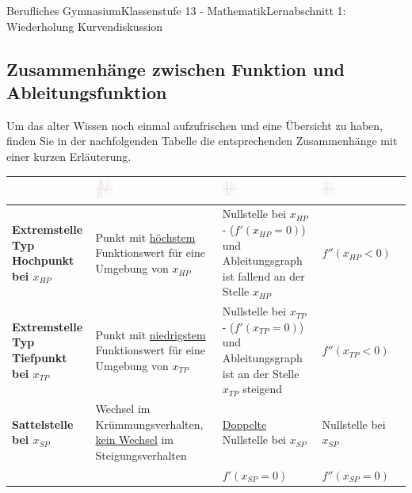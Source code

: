 \documentclass[11pt,twocolumn,oneside,openany,headings=optiontotoc,11pt,numbers=noenddot]{article}
\begin{document}
\begin{worksheet}{Berufliches Gymnasium}{Klassenstufe 13 - Mathematik}{Lernabschnitt 1: Wiederholung Kurvendiskussion}
		\subsection{Zusammenhänge zwischen Funktion und Ableitungsfunktion}
		\label{zsmhg}
		Um das alter Wissen noch einmal aufzufrischen und eine Übersicht zu haben, finden Sie in der nachfolgenden Tabelle die entsprechenden Zusammenhänge mit einer kurzen Erläuterung.\\
		\newpage
		\setlength{\columnseprule}{0pt}
		\begin{tabularx}{\textwidth}{|X|X|X|X|}
			\multicolumn{1}{X|}{}& \includegraphics[width=0.15\textwidth]{../99_Bilder/00_Wdh/Bsp.png} & \includegraphics[width=0.15\textwidth]{../99_Bilder/00_Wdh/Bsp'.png} & \includegraphics[width=0.15\textwidth]{../99_Bilder/00_Wdh/Bsp''.png}\\
			\hline
			\hline
			\textbf{Extremstelle Typ Hochpunkt bei \(x_{HP}\)} & Punkt mit \underline{höchstem} Funktionswert für eine Umgebung von \(x_{HP}\) & Nullstelle bei \(x_{HP}\) - (\(f'(x_{HP} = 0)\)) und Ableitungsgraph ist fallend an der Stelle \(x_{HP}\) & \(f''(x_{HP} < 0)\)\\
			\hline
			\textbf{Extremstelle Typ Tiefpunkt bei \(x_{TP}\)} & Punkt mit \underline{niedrigstem} Funktionswert für eine Umgebung von \(x_{TP}\) & Nullstelle bei \(x_{TP}\) - (\(f'(x_{TP} = 0)\)) und Ableitungsgraph ist an der Stelle \(x_{TP}\) steigend & \(f''(x_{TP} < 0)\)\\
			\hline
			\textbf{Sattelstelle bei \(x_{SP}\)} & Wechsel im Krümmungsverhalten, \underline{kein Wechsel} im Steigungsverhalten & \underline{Doppelte} Nullstelle bei \(x_{SP}\) & Nullstelle bei \(x_{SP}\)\\
			& & \(f'(x_{SP} = 0)\) & \(f''(x_{SP} = 0)\)\\

\end{tabularx}
\end{worksheet}
\end{document}
